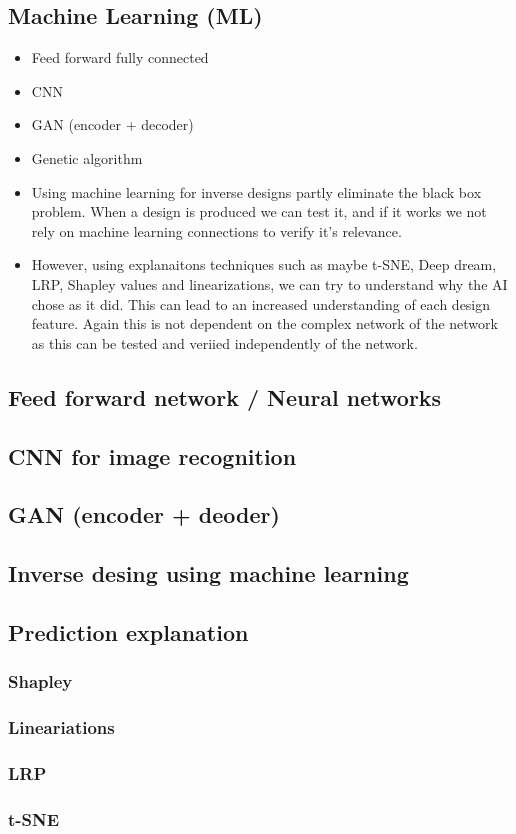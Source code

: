 \subsection{Machine Learning (ML)}
\begin{itemize}
  \item Feed forward fully connected
  \item CNN
  \item GAN (encoder + decoder)
  \item Genetic algorithm
  \item Using machine learning for inverse designs partly eliminate the black box problem. When a design is produced we can test it, and if
  it works we not rely on machine learning connections to verify it's relevance. 
  \item However, using explanaitons techniques such as maybe t-SNE, Deep dream, LRP, Shapley values and linearizations, we can try to
  understand why the AI chose as it did. This can lead to an increased understanding of each design feature. Again this is not dependent on
  the complex network of the network as this can be tested and veriied independently of the network. 
\end{itemize}

\subsection{Feed forward network / Neural networks}
\subsection{CNN for image recognition}
\subsection{GAN (encoder + deoder)}
\subsection{Inverse desing using machine learning}
\subsection{Prediction explanation}
\subsubsection{Shapley}
\subsubsection{Lineariations}
\subsubsection{LRP}
\subsubsection{t-SNE}



